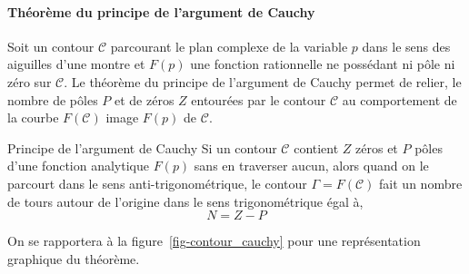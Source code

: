 \paragraph{Théorème du principe de l'argument de Cauchy}

Soit un contour $\mathcal{C}$ parcourant le plan complexe de 
la variable $p$ dans le sens des aiguilles d'une montre et $F(p)$ une fonction rationnelle 
ne possédant ni pôle ni zéro sur $\mathcal{C}$. Le théorème du principe de 
l'argument de Cauchy permet de relier, le nombre de pôles $P$ et de zéros $Z$ entourées par le contour $\mathcal{C}$ 
au comportement de la courbe $F(\mathcal{C})$ image $F(p)$ de $\mathcal{C}$.

\begin{theorem}{Principe de l'argument de Cauchy} 
    Si un contour $\mathcal{C}$ contient $Z$ zéros et $P$ pôles d'une fonction analytique $F(p)$ 
    sans en traverser aucun, alors quand on le parcourt dans le sens anti-trigonométrique, le contour $\Gamma=F(\mathcal{C})$ 
    fait un nombre de tours autour de l'origine dans le sens trigonométrique égal à,
    $$
    N=Z-P
    $$
\end{theorem}

On se rapportera à la figure~\cref{fig-contour_cauchy} pour une représentation graphique du théorème.

